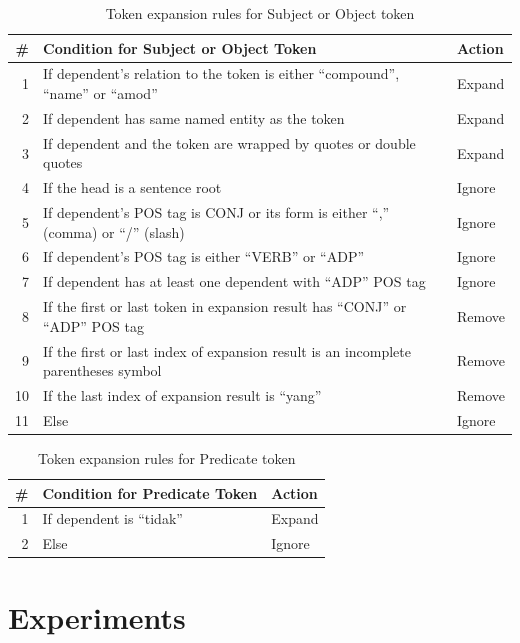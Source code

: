 \documentclass[conference,compsoc]{IEEEtran}
\begin{document}
\begin{table}[!t]
\renewcommand{\arraystretch}{1.5}
\caption{Token expansion rules for Subject or Object token}
\label{table_token_expansion_rules_s_o}
\centering
\begin{tabular}{r|p{6cm}|l}
\hline
\textbf{\#} & \textbf{Condition for Subject or Object Token} & \textbf{Action} \\
\hline
1 & If dependent's relation to the token  is either “compound”, “name”  or “amod” & Expand \\
2 & If dependent has same named entity as the token & Expand \\
3 & If dependent and the token are wrapped by quotes or double quotes  & Expand \\
4 & If the head is a sentence root & Ignore \\
5 & If dependent's POS tag is CONJ or its form is either “,” (comma) or “/” (slash) & Ignore \\
6 & If dependent's POS tag is either “VERB” or “ADP” & Ignore \\
7 & If dependent has at least one dependent with “ADP” POS tag & Ignore \\
8 & If the first or last token in expansion result has “CONJ” or “ADP” POS tag & Remove \\
9 & If the first or last index of expansion result is an incomplete parentheses symbol & Remove \\
10 & If the last index of expansion result is “yang” & Remove \\
11 & Else & Ignore \\

\end{tabular}
\end{table}

\begin{table}[!t]
\renewcommand{\arraystretch}{1.5}
\caption{Token expansion rules for Predicate token}
\label{table_token_expansion_rules_p}
\centering
\begin{tabular}{r|p{6cm}|l}
\hline
\textbf{\#} & \textbf{Condition for Predicate Token} & \textbf{Action} \\
\hline
1 & If dependent is “tidak” & Expand \\
2 & Else & Ignore \\
\end{tabular}
\end{table}

\section{Experiments}
\end{document}
